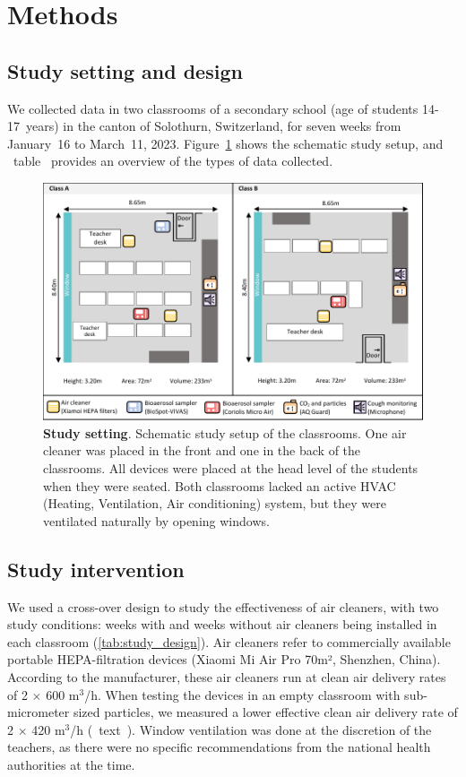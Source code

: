 \documentclass[fleqn,11pt]{wlscirep}
\begin{document}
\newpage

\section{Methods}

\subsection{Study setting and design} 

\noindent We collected data in two classrooms of a secondary school (age of students 14-17~years) in the canton of Solothurn, Switzerland, for seven weeks from January~16 to March~11, 2023. Figure~\ref{fig:study-setup} shows the schematic study setup, and \supp~table~ provides an overview of the types of data collected.

\begin{figure}[!htpb]
    \centering
    \includegraphics{../study_setting.pdf}
    \caption{\textbf{Study setting}. Schematic study setup of the classrooms. One air cleaner was placed in the front and one in the back of the classrooms. All devices were placed at the head level of the students when they were seated. Both classrooms lacked an active HVAC (Heating, Ventilation, Air conditioning) system, but they were ventilated naturally by opening windows. }
    \label{fig:study-setup}
\end{figure}

\subsection{Study intervention} 

\noindent We used a cross-over design to study the effectiveness of air cleaners, with two study conditions: weeks with and weeks without air cleaners being installed in each classroom (\cref{tab:study_design}). Air cleaners refer to commercially available portable HEPA-filtration devices (Xiaomi Mi Air Pro 70m², Shenzhen, China). According to the manufacturer, these air cleaners run at clean air delivery rates of 2$\,\times\,$600 m$^{3}$/h. When testing the devices in an empty classroom with sub-micrometer sized particles, we measured a lower effective clean air delivery rate of 2$\,\times\,$420 m$^{3}$/h (\supp~text~). Window ventilation was done at the discretion of the teachers, as there were no specific recommendations from the national health authorities at the time.
\end{document}
